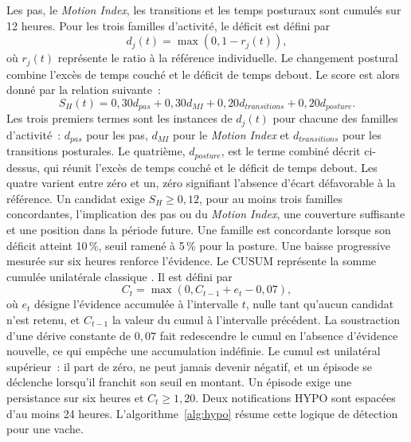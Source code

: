 Les pas, le \textit{Motion Index}, les transitions et les temps posturaux sont cumulés sur
12 heures. Pour les trois familles d'activité, le déficit est défini par
\begin{equation}
  \label{eq:deficit}
d_j(t)=\max(0,1-r_j(t)),
\end{equation}
où \(r_j(t)\) représente le ratio à la référence individuelle. Le changement postural
combine l'excès de temps couché et le déficit de temps debout. Le score est alors donné par la
relation suivante~:
\begin{equation}
  \label{eq:score_hypo}
S_H(t)=0{,}30d_{pas}+0{,}30d_{MI}+0{,}20d_{transitions}+0{,}20d_{posture}.
\end{equation}
Les trois premiers termes sont les instances de \(d_j(t)\) pour chacune des familles
d'activité~: \(d_{pas}\) pour les pas, \(d_{MI}\) pour le \textit{Motion Index} et
\(d_{transitions}\) pour les transitions posturales. Le quatrième, \(d_{posture}\), est le
terme combiné décrit ci-dessus, qui réunit l'excès de temps couché et le déficit de temps
debout. Les quatre varient entre zéro et un, zéro signifiant l'absence d'écart défavorable à
la référence.
Un candidat exige \(S_H\geq0{,}12\), pour au moins trois familles concordantes, l'implication des
pas ou du \textit{Motion Index}, une couverture suffisante et une position dans la période future.
Une famille est concordante lorsque son déficit atteint 10\,\%, seuil ramené à 5\,\% pour la
posture.
Une baisse progressive mesurée sur six heures renforce l'évidence. Le CUSUM représente la
somme cumulée unilatérale classique \citep{page1954continuous}. Il est défini par
\begin{equation}
  \label{eq:cusum}
C_t=\max(0,C_{t-1}+e_t-0{,}07),
\end{equation}
où \(e_t\) désigne l'évidence accumulée à l'intervalle
\(t\), nulle tant qu'aucun candidat n'est retenu, et \(C_{t-1}\) la valeur du cumul à
l'intervalle précédent. La soustraction d'une dérive constante de \(0{,}07\) fait redescendre
le cumul en l'absence d'évidence nouvelle, ce qui empêche une accumulation indéfinie. Le
cumul est unilatéral supérieur~: il part de zéro, ne peut jamais devenir négatif, et un
épisode se déclenche lorsqu'il franchit son seuil en montant.
Un épisode exige une persistance sur six heures et
\(C_t\geq1{,}20\). Deux notifications HYPO sont espacées d'au moins 24 heures. L'algorithme~\ref{alg:hypo}
résume cette logique de détection pour une vache.

